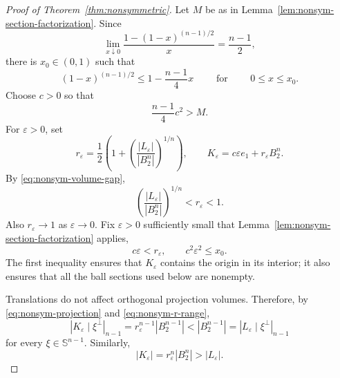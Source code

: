 \documentclass[11pt]{article}
\theoremstyle{remark}
\newcommand{\Sph}{\mathbb{S}}
\begin{document}
\begin{proof}[Proof of Theorem~\ref{thm:nonsymmetric}]
Let $M$ be as in Lemma~\ref{lem:nonsym-section-factorization}.  Since
\[
 \lim_{x\downarrow0}
 \frac{1-(1-x)^{(n-1)/2}}{x}=\frac{n-1}{2},
\]
there is $x_0\in(0,1)$ such that
\begin{equation}\label{eq:nonsym-elementary}
 (1-x)^{(n-1)/2}\leq1-\frac{n-1}{4}x\qquad \mbox{ for }
 \qquad 0\leq x\leq x_0.
\end{equation}
Choose $c>0$ so that
\begin{equation}\label{eq:nonsym-c-choice}
 \frac{n-1}{4}c^2>M.
\end{equation}
For $\varepsilon>0$, set
\begin{equation}\label{eq:nonsym-K}
 r_\varepsilon
 =\frac12\left(
  1+\left(\frac{|L_\varepsilon|}{|B_2^n|}\right)^{1/n}
 \right),
 \qquad
 K_\varepsilon=c\varepsilon e_1+r_\varepsilon B_2^n.
\end{equation}
By \eqref{eq:nonsym-volume-gap},
\begin{equation}\label{eq:nonsym-r-range}
 \left(\frac{|L_\varepsilon|}{|B_2^n|}\right)^{1/n}
 <r_\varepsilon<1.
\end{equation}
Also $r_\varepsilon\to1$ as $\varepsilon\to0$.  Fix $\varepsilon>0$ sufficiently small that Lemma~\ref{lem:nonsym-section-factorization}
applies,
\[
 c\varepsilon<r_\varepsilon,
 \qquad c^2\varepsilon^2\leq x_0.
\]
The first inequality ensures that $K_\varepsilon$ contains the origin in
its interior; it also ensures that all the ball sections used below are
nonempty.

Translations do not affect orthogonal projection volumes.  Therefore,
by \eqref{eq:nonsym-projection} and \eqref{eq:nonsym-r-range},
\[
 |K_\varepsilon\mid\xi^\perp|_{n-1}
 =r_\varepsilon^{n-1}|B_2^{n-1}|
 <|B_2^{n-1}|
 =|L_\varepsilon\mid\xi^\perp|_{n-1}
\]
for every $\xi\in\Sph^{n-1}$.  Similarly,
\[
 |K_\varepsilon|
 =r_\varepsilon^n|B_2^n|
 >|L_\varepsilon|.
\]


\end{proof}
\end{document}
